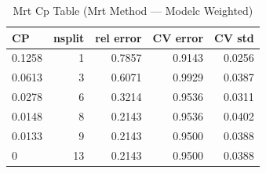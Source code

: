 \begin{table}[htbp]
  \centering
  \caption{Mrt Cp Table (Mrt Method — Modelc Weighted)}
  \label{tab:MRT_Method_ModelC_Weighted_tables_mrt_cp_table}
  \begin{tabular}{lrrrr}
    \toprule
    CP & nsplit & rel error & CV error & CV std \\
    \midrule
    0.1258 & 1 & 0.7857 & 0.9143 & 0.0256 \\
    0.0613 & 3 & 0.6071 & 0.9929 & 0.0387 \\
    0.0278 & 6 & 0.3214 & 0.9536 & 0.0311 \\
    0.0148 & 8 & 0.2143 & 0.9536 & 0.0402 \\
    0.0133 & 9 & 0.2143 & 0.9500 & 0.0388 \\
    0 & 13 & 0.2143 & 0.9500 & 0.0388 \\
    \bottomrule
  \end{tabular}
\end{table}
